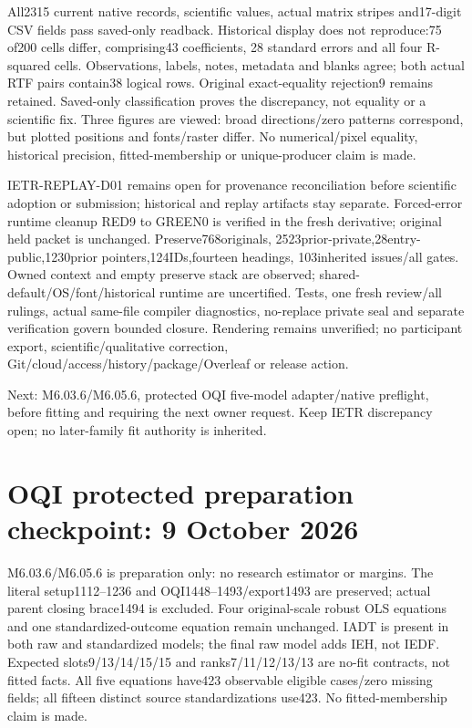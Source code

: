 \documentclass[11pt,a4paper]{article}
\begin{document}
All2315 current native records, scientific values, actual matrix stripes
and17-digit CSV fields pass saved-only readback. Historical display does
not reproduce:75 of200 cells differ, comprising43 coefficients,
28 standard errors and all four R-squared cells. Observations, labels,
notes, metadata and blanks agree; both actual RTF pairs contain38 logical
rows. Original exact-equality rejection9 remains retained. Saved-only
classification proves the discrepancy, not equality or a scientific fix.
Three figures are viewed: broad directions/zero patterns correspond,
but plotted positions and fonts/raster differ. No numerical/pixel equality,
historical precision, fitted-membership or unique-producer claim is made.

IETR-REPLAY-D01 remains open for provenance reconciliation before scientific
adoption or submission; historical and replay artifacts stay separate.
Forced-error runtime cleanup RED9 to GREEN0 is verified in the fresh
derivative; original held packet is unchanged. Preserve768originals,
2523prior-private,28entry-public,1230prior pointers,124IDs,fourteen headings,
103inherited issues/all gates. Owned context and empty preserve stack
are observed; shared-default/OS/font/historical runtime are uncertified.
Tests, one fresh review/all rulings, actual same-file compiler diagnostics,
no-replace private seal and separate verification govern bounded closure.
Rendering remains unverified; no participant export, scientific/qualitative
correction, Git/cloud/access/history/package/Overleaf or release action.

Next: M6.03.6/M6.05.6, protected OQI five-model adapter/native preflight,
before fitting and requiring the next owner request. Keep IETR discrepancy
open; no later-family fit authority is inherited.

\section*{OQI protected preparation checkpoint: 9 October 2026}
M6.03.6/M6.05.6 is preparation only: no research estimator or margins.
The literal setup1112--1236 and OQI1448--1493/export1493 are preserved;
actual parent closing brace1494 is excluded. Four original-scale robust
OLS equations and one standardized-outcome equation remain unchanged.
IADT is present in both raw and standardized models; the final raw model
adds IEH, not IEDF. Expected slots9/13/14/15/15 and ranks7/11/12/13/13
are no-fit contracts, not fitted facts. All five equations have423
observable eligible cases/zero missing fields; all fifteen distinct
source standardizations use423. No fitted-membership claim is made.
\end{document}
